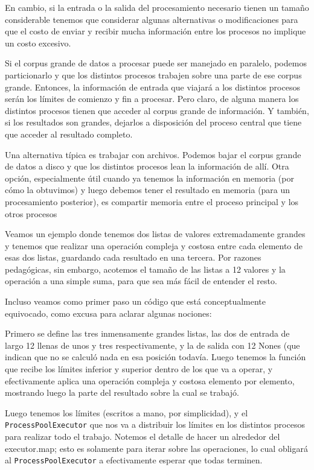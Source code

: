En cambio, si la entrada o la salida del procesamiento necesario tienen un tamaño considerable tenemos que considerar algunas alternativas o modificaciones para que el costo de enviar y recibir mucha información entre los procesos no implique un costo excesivo.

Si el corpus grande de datos a procesar puede ser manejado en paralelo, podemos particionarlo y que los distintos procesos trabajen sobre una parte de ese corpus grande. Entonces, la información de entrada que viajará a los distintos procesos serán los límites de comienzo y fin a procesar. Pero claro, de alguna manera los distintos procesos tienen que acceder al corpus grande de información. Y también, si los resultados son grandes, dejarlos a disposición del proceso central que tiene que acceder al resultado completo.

Una alternativa típica es trabajar con archivos. Podemos bajar el corpus grande de datos a disco y que los distintos procesos lean la información de allí. Otra opción, especialmente útil cuando ya tenemos la información en memoria (por cómo la obtuvimos) y luego debemos tener el resultado en memoria (para un procesamiento posterior), es compartir memoria entre el proceso principal y los otros procesos 

Veamos un ejemplo donde tenemos dos listas de valores extremadamente grandes y tenemos que realizar una operación compleja y costosa entre cada elemento de esas dos listas, guardando cada resultado en una tercera. Por razones pedagógicas, sin embargo, acotemos el tamaño de las listas a 12 valores y la operación a una simple suma, para que sea más fácil de entender el resto.

Incluso veamos como primer paso un código que está conceptualmente equivocado, como excusa para aclarar algunas nociones:


Primero se define las tres inmensamente grandes listas, las dos de entrada de largo 12 llenas de unos y tres respectivamente, y la de salida con 12 Nones (que indican que no se calculó nada en esa posición todavía. Luego tenemos la función que recibe los límites inferior y superior dentro de los que va a operar, y efectivamente aplica una operación compleja y costosa elemento por elemento, mostrando luego la parte del resultado sobre la cual se trabajó.

Luego tenemos los límites (escritos a mano, por simplicidad), y el \texttt{ProcessPoolExecutor} que nos va a distribuir los límites en los distintos procesos para realizar todo el trabajo. Notemos el detalle de hacer un  alrededor del {executor.map}; esto es solamente para iterar sobre las operaciones, lo cual obligará al \texttt{ProcessPoolExecutor} a efectivamente esperar que todas terminen. 

